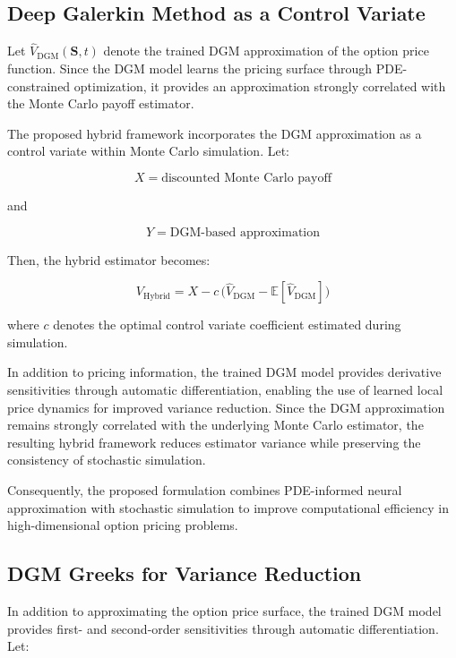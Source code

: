 \documentclass[12pt, a4paper]{article}
\begin{document}
\subsection{Deep Galerkin Method as a Control Variate}

Let $\hat{V}_{\mathrm{DGM}}(\mathbf{S},t)$ denote the trained DGM
approximation of the option price function. Since the DGM model learns
the pricing surface through PDE-constrained optimization, it provides
an approximation strongly correlated with the Monte Carlo payoff
estimator.

The proposed hybrid framework incorporates the DGM approximation as a
control variate within Monte Carlo simulation. Let:

\[
    X = \text{discounted Monte Carlo payoff}
\]

and

\[
    Y = \text{DGM-based approximation}
\]

Then, the hybrid estimator becomes:

\begin{equation}
    V_{\mathrm{Hybrid}} = X - c\,\bigl(\hat{V}_{\mathrm{DGM}}
    - \mathbb{E}[\hat{V}_{\mathrm{DGM}}]\bigr)
    \label{eq:hybrid_estimator}
\end{equation}

where $c$ denotes the optimal control variate coefficient estimated
during simulation.

In addition to pricing information, the trained DGM model provides
derivative sensitivities through automatic differentiation, enabling
the use of learned local price dynamics for improved variance
reduction. Since the DGM approximation remains strongly correlated with
the underlying Monte Carlo estimator, the resulting hybrid framework
reduces estimator variance while preserving the consistency of
stochastic simulation.

Consequently, the proposed formulation combines PDE-informed neural
approximation with stochastic simulation to improve computational
efficiency in high-dimensional option pricing problems.

\subsection{DGM Greeks for Variance Reduction}

In addition to approximating the option price surface, the trained DGM
model provides first- and second-order sensitivities through automatic
differentiation. Let:
\end{document}
